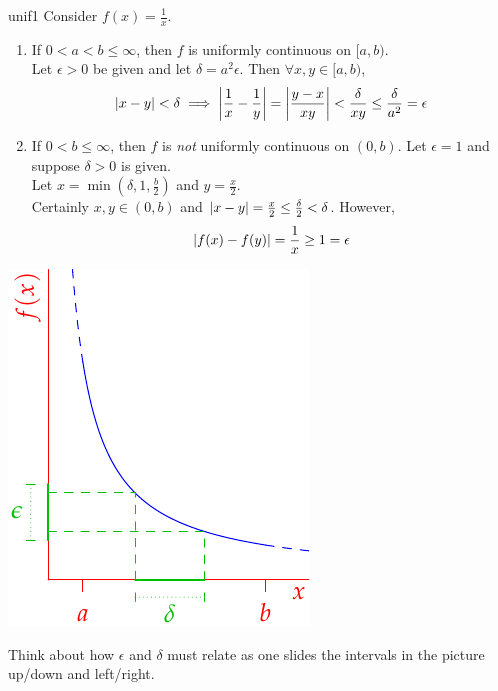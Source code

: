 \begin{example}{}{unif1}
Consider $f(x)=\frac 1x$.\smallbreak
\begin{minipage}[t]{0.65\linewidth}\vspace{-8pt}
\begin{enumerate}
\item If $0<a<b\le \infty$, then $f$ is uniformly continuous on $[a,b)$.\\
Let $\epsilon>0$ be given and let $\delta=a^2\epsilon$. Then $\forall x,y\in[a,b)$,
\[\left| x-y\right|<\delta \implies \left| \frac 1x-\frac 1y\right|=\left| \frac{y-x}{xy}\right|<\frac\delta{xy}\le\frac{\delta}{a^2}=\epsilon\]
\item If $0<b\le\infty$, then $f$ is \emph{not} uniformly continuous on $(0,b)$.\smallbreak
Let $\epsilon=1$ and suppose $\delta>0$ is given.\\
Let $x=\min(\delta,1,\tfrac b2)$ and $y=\frac x2$.\\
Certainly $x,y\in(0,b)$ and $\left| x-y\right|=\frac x2\le\frac\delta 2<\delta$. However,
\[\left| f(x)-f(y)\right|=\frac 1x\ge 1=\epsilon\]
\end{enumerate}
\end{minipage}
\begin{minipage}[t]{0.34\linewidth}\vspace{0pt}
\flushright\includegraphics{unif1}
\end{minipage}\bigbreak
Think about how $\epsilon$ and $\delta$ must relate as one slides the intervals in the picture up/down and left/right.
\end{example}

